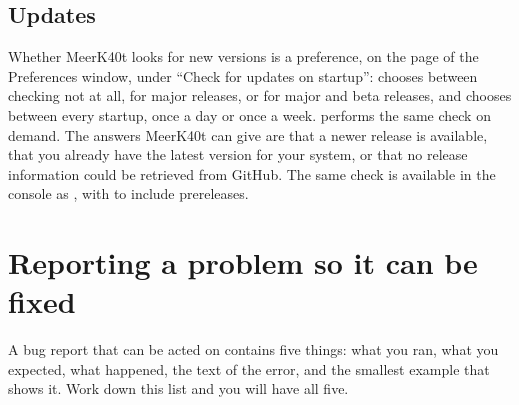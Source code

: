 \subsection*{Updates}

Whether MeerK40t looks for new versions is a preference, on the
 page of the Preferences window, under ``Check for updates on
startup'':  chooses between checking not at all, for major releases,
or for major and beta releases, and  chooses between every startup,
once a day or once a week.  performs the same check
on demand. The answers MeerK40t can give are that a newer release is available,
that you already have the latest version for your system, or that no release
information could be retrieved from GitHub. The same check is available in the
console as , with  to include prereleases.

\section*{Reporting a problem so it can be fixed}

A bug report that can be acted on contains five things: what you ran, what you
expected, what happened, the text of the error, and the smallest example that
shows it. Work down this list and you will have all five.

